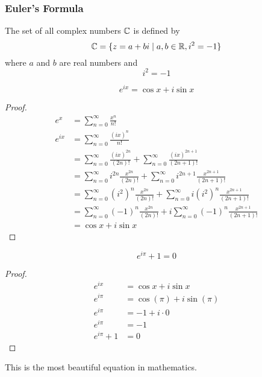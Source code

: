 \subsubsection*{Euler's Formula}

The set of all complex numbers \(\mathbb{C}\) is defined by
\[\mathbb{C}=\{z=a+bi\mid a,b\in\mathbb{R},i^2=-1\}\]
where \(a\) and \(b\) are real numbers and
\[i^2=-1\]
\begin{theorem}
    \[e^{ix}=\cos x+i\sin x\]
\end{theorem}
\begin{proof}
    \begin{align*}
        e^x &= \sum_{n=0}^\infty\frac{x^n}{n!} \\
        e^{ix} &= \sum_{n=0}^\infty\frac{(ix)^n}{n!} \\
        &= \sum_{n=0}^\infty\frac{(ix)^{2n}}{(2n)!}
        +\sum_{n=0}^\infty\frac{(ix)^{2n+1}}{(2n+1)!} \\
        &= \sum_{n=0}^\infty i^{2n}\frac{x^{2n}}{(2n)!}
        +\sum_{n=0}^\infty i^{2n+1}\frac{x^{2n+1}}{(2n+1)!} \\
        &= \sum_{n=0}^\infty(i^2)^n\frac{x^{2n}}{(2n)!}
        +\sum_{n=0}^\infty i(i^2)^n\frac{x^{2n+1}}{(2n+1)!} \\
        &= \sum_{n=0}^\infty(-1)^n\frac{x^{2n}}{(2n)!}
        +i\sum_{n=0}^\infty(-1)^n\frac{x^{2n+1}}{(2n+1)!} \\
        &= \cos x+i\sin x
    \end{align*}
\end{proof}
\begin{theorem}
    \[e^{i\pi}+1=0\]
\end{theorem}
\begin{proof}
    \begin{align*}
        e^{ix} &=\cos x+i\sin x \\
        e^{i\pi} &= \cos(\pi)+i\sin(\pi) \\
        e^{i\pi} &= -1+i\cdot0 \\
        e^{i\pi} &= -1 \\
        e^{i\pi}+1 &= 0
    \end{align*}
\end{proof}
This is the most beautiful equation in mathematics.